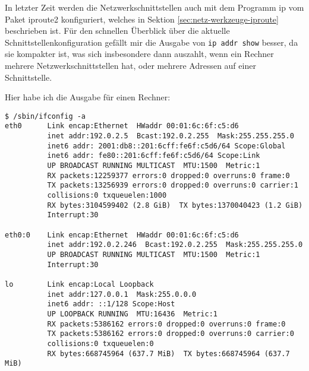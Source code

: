 \begin{normaltext}
  In letzter Zeit werden die Netzwerkschnittstellen auch mit dem Programm ip
  vom Paket iproute2 konfiguriert, welches in Sektion
  \ref{sec:netz-werkzeuge-iproute} beschrieben ist.
  Für den schnellen Überblick über die aktuelle Schnittstellenkonfiguration
  gefällt mir die Ausgabe von \verb?ip addr show? besser, da sie kompakter
  ist, was sich insbesondere dann auszahlt, wenn ein Rechner mehrere
  Netzwerkschnittstellen hat, oder mehrere Adressen auf einer Schnittstelle.

  Hier habe ich die Ausgabe für einen Rechner:
  \begin{verbatim}
$ /sbin/ifconfig -a
eth0      Link encap:Ethernet  HWaddr 00:01:6c:6f:c5:d6  
          inet addr:192.0.2.5  Bcast:192.0.2.255  Mask:255.255.255.0
          inet6 addr: 2001:db8::201:6cff:fe6f:c5d6/64 Scope:Global
          inet6 addr: fe80::201:6cff:fe6f:c5d6/64 Scope:Link
          UP BROADCAST RUNNING MULTICAST  MTU:1500  Metric:1
          RX packets:12259377 errors:0 dropped:0 overruns:0 frame:0
          TX packets:13256939 errors:0 dropped:0 overruns:0 carrier:1
          collisions:0 txqueuelen:1000 
          RX bytes:3104599402 (2.8 GiB)  TX bytes:1370040423 (1.2 GiB)
          Interrupt:30 

eth0:0    Link encap:Ethernet  HWaddr 00:01:6c:6f:c5:d6  
          inet addr:192.0.2.246  Bcast:192.0.2.255  Mask:255.255.255.0
          UP BROADCAST RUNNING MULTICAST  MTU:1500  Metric:1
          Interrupt:30 

lo        Link encap:Local Loopback  
          inet addr:127.0.0.1  Mask:255.0.0.0
          inet6 addr: ::1/128 Scope:Host
          UP LOOPBACK RUNNING  MTU:16436  Metric:1
          RX packets:5386162 errors:0 dropped:0 overruns:0 frame:0
          TX packets:5386162 errors:0 dropped:0 overruns:0 carrier:0
          collisions:0 txqueuelen:0 
          RX bytes:668745964 (637.7 MiB)  TX bytes:668745964 (637.7 MiB)


\end{verbatim}
\end{normaltext}
